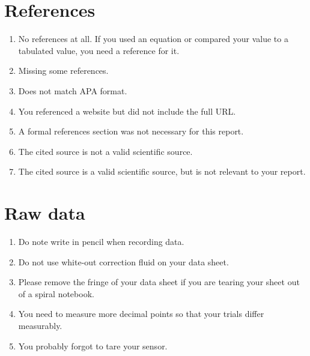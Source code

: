 \documentclass[10pt,letterpaper]{article}
\begin{document}
\begin{multicols}{2}
\section*{References}

\begin{enumerate}[start=150]
  \item No references at all.
    If you used an equation or compared your value to a tabulated value,
    you need a reference for it.
  \item Missing some references.
  \item Does not match APA format.
  \item You referenced a website but did not include the full URL.
  \item A formal references section was not necessary for this report.
  \item The cited source is not a valid scientific source.
  \item The cited source is a valid scientific source,
    but is not relevant to your report.
\end{enumerate}

\section*{Raw data}

\begin{enumerate}[start=160]
  \item Do note write in pencil when recording data.
  \item Do not use white-out correction fluid on your data sheet.
  \item Please remove the fringe of your data sheet
    if you are tearing your sheet out of a spiral notebook.
  \item You need to measure more decimal points
    so that your trials differ measurably.
  \item You probably forgot to tare your sensor.
\end{enumerate}

\end{multicols}
\end{document}
